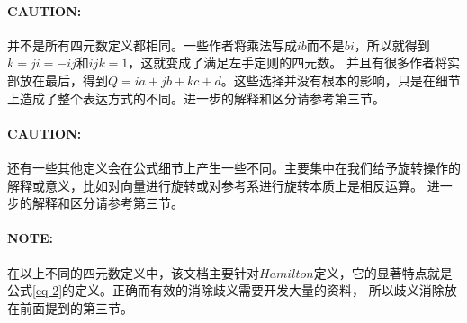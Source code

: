 \documentclass[10pt, a4paper]{article}
\begin{document}
  \paragraph{CAUTION:}
  并不是所有四元数定义都相同。一些作者将乘法写成$ib$而不是$bi$，所以就得到$k = ji = -ij$和$ijk=1$，这就变成了满足左手定则的四元数。
  并且有很多作者将实部放在最后，得到$Q=ia+jb+kc+d$。这些选择并没有根本的影响，只是在细节上造成了整个表达方式的不同。进一步的解释和区分请参考第三节。
  \paragraph{CAUTION:}
  还有一些其他定义会在公式细节上产生一些不同。主要集中在我们给予旋转操作的解释或意义，比如对向量进行旋转或对参考系进行旋转本质上是相反运算。
  进一步的解释和区分请参考第三节。
  \paragraph{NOTE:}
  在以上不同的四元数定义中，该文档主要针对$Hamilton$定义，它的显著特点就是公式\eqref{eq-2}的定义。正确而有效的消除歧义需要开发大量的资料，
  所以歧义消除放在前面提到的第三节。
\end{document}
